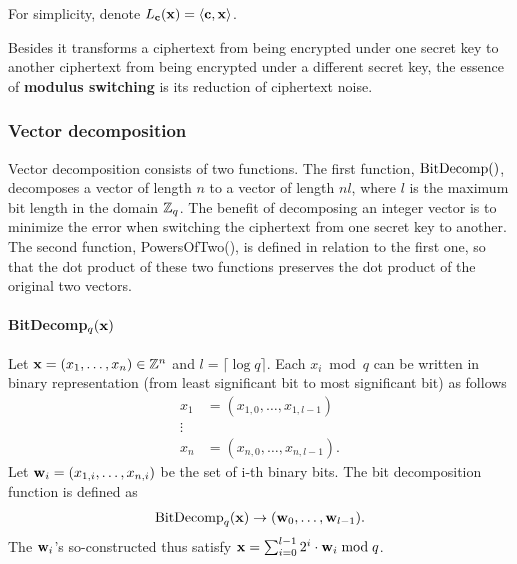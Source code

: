 \documentclass[../main.tex]{subfiles}
\begin{document}
For simplicity, denote $L_{\mathbf{c}}(\mathbf{x})=\langle{\mathbf{c},\mathbf{x}}\rangle$.

Besides it transforms a ciphertext from being encrypted under one secret key to another ciphertext from being encrypted under a different secret key, the essence of \textbf{modulus switching} is its reduction of ciphertext noise.
\fi 



\subsubsection{Vector decomposition} Vector decomposition consists of two functions. The first function, $\text{BitDecomp}()$, decomposes a vector of length $n$ to a vector of length $nl$, where $l$ is the maximum bit length in the domain $\mathbb{Z}_q$. The benefit of decomposing an integer vector is to minimize the error when switching the ciphertext from one secret key to another. The second function, PowersOfTwo(), is defined in relation to the first one, so that the dot product of these two functions preserves the dot product of the original two vectors. %

\paragraph{BitDecomp$_q(\mathbf{x})$} Let $\mathbf{x} = (x_1, \dots, x_n) \in \mathbb{Z}^n$ and $l = \lceil \log q \rceil$. %
Each $x_i \bmod q$ can be written in binary representation (from least significant bit to most significant bit) as follows  
\begin{align*}
    x_1 &= (x_{1,0}, \dots, x_{1,l-1} )\\
    \vdots \\
    x_n &= (x_{n,0}, \dots, x_{n,l-1} ).
\end{align*}
Let $\mathbf{w}_i=(x_{1,i},\dots,x_{n,i})$ be the set of i-th binary bits. The bit decomposition function is defined as
\begin{align*}
    \bitdecomp_q(\vc{x}) \rightarrow (\vc{w}_0, \dots, \vc{w}_{l-1}). %
\end{align*}
The $\mathbf{w}_i$'s so-constructed thus satisfy $\mathbf{x} = \sum_{i=0}^{l-1} 2^i \cdot \mathbf{w}_i \bmod q$.
    
\end{document}
